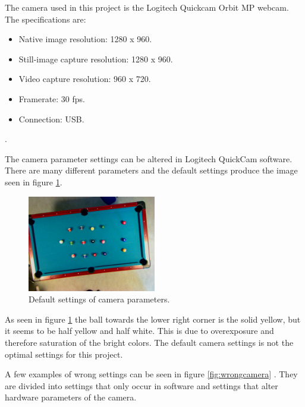The camera used in this project is the Logitech Quickcam Orbit MP webcam. The specifications are:

\begin{itemize}
\setlength{\itemsep}{0mm}
	\item Native image resolution: 1280 x 960.
	\item Still-image capture resolution: 1280 x 960.
	\item Video capture resolution: 960 x 720.
	\item Framerate: 30 fps.
	\item Connection: USB.
\end{itemize}.

The camera parameter settings can be altered in Logitech QuickCam software. There are many different parameters and the default settings produce the image seen in figure \ref{fig:defaultcamera}.

\begin{figure}[htpb]
\begin{center}
\leavevmode
\includegraphics[width=0.5\textwidth]{images/default}
\end{center}
\caption{Default settings of camera parameters.}
\label{fig:defaultcamera}
\end{figure} 
	
As seen in figure \ref{fig:defaultcamera} the ball towards the lower right corner is the solid yellow, but it seems to be half yellow and half white. This is due to overexposure and therefore saturation of the bright colors. The default camera settings is not the optimal settings for this project.	

A few examples of wrong settings can be seen in figure \ref{fig:wrongcamera} . They are divided into settings that only occur in software and settings that alter hardware parameters of the camera.

